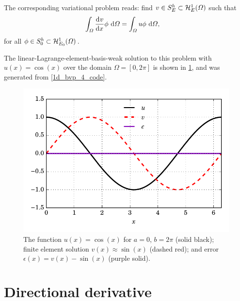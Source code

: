   The corresponding variational problem reads: find $v \in S_E^h \subset \mathcal{H}_E^1(\varOmega)$ such that
  \begin{align*}
    \int_{\varOmega} \frac{\mathrm{d}{^{}} v}{\mathrm{d} x{^{}} } \phi \ \mathrm{d}\varOmega &= \int_{\varOmega} u \phi \ \mathrm{d}\varOmega,
  \end{align*}
  for all $\phi \in S_0^h \subset \mathcal{H}_{E_0}^1(\varOmega)$.
  
  The linear-Lagrange-element-basis-weak solution to this problem with $u(x) = \cos(x)$ over the domain $\Omega = [0,2\pi]$ is shown in \cref{1d_bvp_4_image}, and was generated from \cref{1d_bvp_4_code}. 

  
  \begin{figure}
    \centering
      \includegraphics[width=\linewidth]{images/fenics_intro/1D_BVP_4.pdf}
    \caption[BVP example two solution]{The function $u(x) = \cos(x)$ for $a=0$, $b=2\pi$ (solid black); finite element solution $v(x) \approx \sin(x)$ (dashed red); and error $\epsilon(x) = v(x) - \sin(x)$ (purple solid).}
    \label{1d_bvp_4_image}
  \end{figure}

  
  \section{Directional derivative} \label{ssn_intro_directional_deriavative}
 
